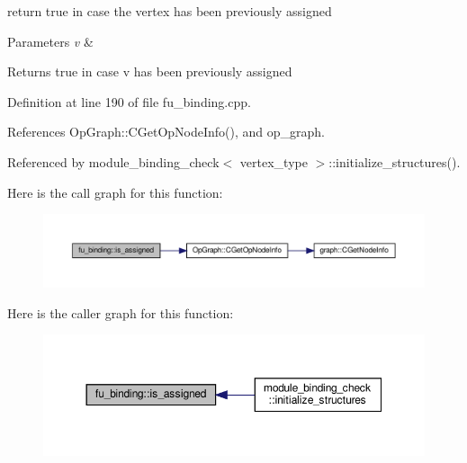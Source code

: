 return true in case the vertex has been previously assigned 


\begin{DoxyParams}{Parameters}
{\em v} & \\
\hline
\end{DoxyParams}
\begin{DoxyReturn}{Returns}
true in case v has been previously assigned 
\end{DoxyReturn}


Definition at line 190 of file fu\+\_\+binding.\+cpp.



References Op\+Graph\+::\+C\+Get\+Op\+Node\+Info(), and op\+\_\+graph.



Referenced by module\+\_\+binding\+\_\+check$<$ vertex\+\_\+type $>$\+::initialize\+\_\+structures().

Here is the call graph for this function\+:
\nopagebreak
\begin{figure}[H]
\begin{center}
\leavevmode
\includegraphics[width=350pt]{d8/d04/classfu__binding_a083bb7586153b82403d770d191c660aa_cgraph}
\end{center}
\end{figure}
Here is the caller graph for this function\+:
\nopagebreak
\begin{figure}[H]
\begin{center}
\leavevmode
\includegraphics[width=350pt]{d8/d04/classfu__binding_a083bb7586153b82403d770d191c660aa_icgraph}
\end{center}
\end{figure}
\mbox{\label{classfu__binding_a78c721c13b733499ba559e67ed2318b2}} 
